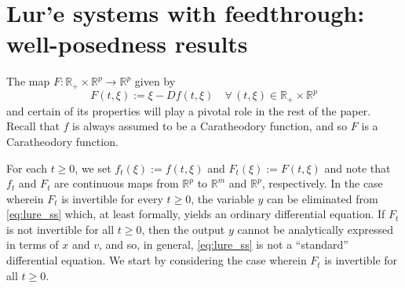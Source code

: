 \documentclass[a4paper,11pt]{article}
\newcommand{\R}{\mathbb R}
\numberwithin{equation}{section}
\numberwithin{figure}{section}
\numberwithin{table}{section}
\begin{document}
\section{Lur'e systems with feedthrough: well-posedness results}\label{sec:wp}
%
The map $F:\R_+\times\R^p\to\R^p$ given by
\[
F(t,\xi):=\xi-Df(t,\xi)\quad\forall\,(t,\xi)\in\R_+\times \R^p
\]
and certain of its properties will play a pivotal role in the rest of the paper.
Recall that $f$ is always assumed to be a Caratheodory function, and so $F$ is
a Caratheodory function.

For each $t\geq 0$, we set $f_t(\xi):=f(t,\xi)$ and $F_t(\xi):=F(t,\xi)$ and note that $f_t$ and $F_t$ are continuous maps from $\R^p$ to $\R^m$ and $\R^p$, respectively. In the case wherein $F_t$ is invertible for every $t \geq 0$, the variable $y$ can be eliminated from \eqref{eq:lure_ss} which, at least formally, yields an ordinary
differential equation. If $F_t$ is not invertible for all $t\geq 0$, then the output $y$ cannot be analytically expressed in terms of $x$ and $v$, and so, in general, \eqref{eq:lure_ss} is not a ``standard'' differential equation. We start by considering the case wherein $F_t$ is invertible for all $t\geq 0$.
%
\end{document}
